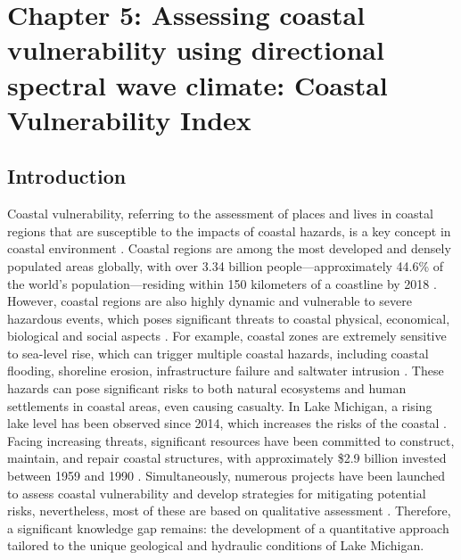 \chapter{Chapter 5:  Assessing coastal vulnerability using directional spectral
wave climate: Coastal Vulnerability Index} 
\label{chapter5}


\section{Introduction}
\label{c5_Introduction}

Coastal vulnerability, referring to the assessment of places and lives in
coastal regions that are susceptible to the impacts of coastal hazards, is a key
concept in coastal environment \citep{bevacqua_coastal_2018}. Coastal regions
are among the most developed and densely populated areas globally, with over
3.34 billion people—approximately 44.6\% of the world's population—residing
within 150 kilometers of a coastline by 2018 \citep{cosby_accelerating_2024}.
However, coastal regions are also highly dynamic and vulnerable to severe
hazardous events, which poses significant threats to coastal physical,
economical, biological and social aspects
\citep{bevacqua_coastal_2018,kantamaneni_assessing_2018}. For example, coastal
zones are extremely sensitive to sea-level rise, which can trigger multiple
coastal hazards, including coastal flooding, shoreline erosion, infrastructure
failure and saltwater intrusion \citep{gornitz_global_1991}. These hazards can
pose significant risks to both natural ecosystems and human settlements in
coastal areas, even causing casualty. In Lake Michigan, a rising lake level has
been observed since 2014, which increases the risks of the coastal
\citep{gronewold_hydrological_2016,zoet_analysis_2017,troy_rapid_2021}. Facing
increasing threats, significant resources have been committed to construct,
maintain, and repair coastal structures, with approximately \$2.9 billion
invested between 1959 and 1990 \citep{angel_large-scale_1995}. Simultaneously,
numerous projects have been launched to assess coastal vulnerability and develop
strategies for mitigating potential risks, nevertheless, most of these are based
on qualitative assessment \citep{salus_addressing_2024}. Therefore, a
significant knowledge gap remains: the development of a quantitative approach
tailored to the unique geological and hydraulic conditions of Lake Michigan.

